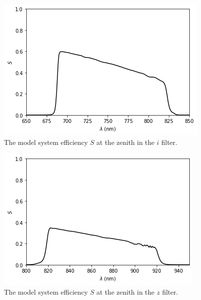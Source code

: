 \begin{figure}
\begin{center}
\includegraphics[width=0.9\linewidth]{figures/huitzi-S-i.png}
\medskip
\caption{The model system efficiency $S$ at the zenith in the $i$ filter.}
\end{center}
\end{figure}

\begin{figure}
\begin{center}
\includegraphics[width=0.9\linewidth]{figures/huitzi-S-z.png}
\medskip
\caption{The model system efficiency $S$ at the zenith in the $z$ filter.}
\end{center}
\end{figure}

